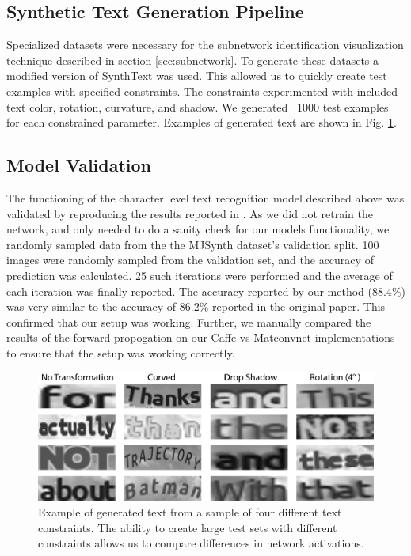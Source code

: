 \documentclass[10pt,twocolumn,letterpaper]{article}
\begin{document}
\subsection{Synthetic Text Generation Pipeline} \label{sec:synthtext}
Specialized datasets were necessary for the subnetwork identification visualization technique described in section \ref{sec:subnetwork}.
To generate these datasets a modified version of SynthText \cite{Gupta16} was used. This allowed us to quickly create test examples with specified constraints. The constraints experimented with included text color, rotation, curvature, and shadow. We generated ~1000 test examples for each constrained parameter. Examples of generated text are shown in Fig. \ref{fig:genText}.


\subsection{Model Validation}
The functioning of the character level text recognition model described above was validated by reproducing the results reported in \cite{Jaderberg14c}. As we did not retrain the network, and only needed to do a sanity check for our models functionality, we randomly sampled data from the the MJSynth dataset's validation split. 100 images were randomly sampled from the validation set, and the accuracy of prediction was calculated. 25 such iterations were performed and the average of each iteration was finally reported. The accuracy reported by our method (88.4$\%$) was very similar to the accuracy of 86.2$\%$ reported in the original paper. This confirmed that our setup was working. Further, we manually compared the results of the forward propogation on our Caffe vs Matconvnet implementations to ensure that the setup was working correctly.


\begin{figure}
\includegraphics[width=\columnwidth]{Figures/synthtext_outputs/synthext_outputs.png}
\caption{Example of generated text from a sample of four different text constraints. The ability to create large test sets with different constraints allows us to compare differences in network activations.}
\label{fig:genText}
\end{figure}
\end{document}
